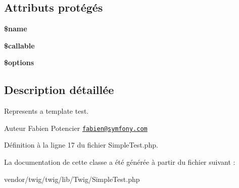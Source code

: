\subsection*{Attributs protégés}
\begin{DoxyCompactItemize}
\item 
{\bfseries \$name}\hypertarget{class_twig___simple_test_ab2fc40d43824ea3e1ce5d86dee0d763b}{}\label{class_twig___simple_test_ab2fc40d43824ea3e1ce5d86dee0d763b}

\item 
{\bfseries \$callable}\hypertarget{class_twig___simple_test_ae3d0fc9fa800751a4a5e2917209d85f2}{}\label{class_twig___simple_test_ae3d0fc9fa800751a4a5e2917209d85f2}

\item 
{\bfseries \$options}\hypertarget{class_twig___simple_test_a011800c63ece4cbbfa77136a20607023}{}\label{class_twig___simple_test_a011800c63ece4cbbfa77136a20607023}

\end{DoxyCompactItemize}


\subsection{Description détaillée}
Represents a template test.

\begin{DoxyAuthor}{Auteur}
Fabien Potencier \href{mailto:fabien@symfony.com}{\tt fabien@symfony.\+com} 
\end{DoxyAuthor}


Définition à la ligne 17 du fichier Simple\+Test.\+php.



La documentation de cette classe a été générée à partir du fichier suivant \+:\begin{DoxyCompactItemize}
\item 
vendor/twig/twig/lib/\+Twig/Simple\+Test.\+php\end{DoxyCompactItemize}
